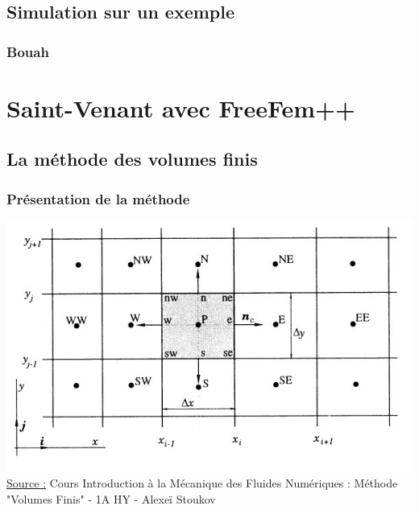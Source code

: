 \documentclass[handout]{beamer}
\begin{document}
\subsection[Simulation]{Simulation sur un exemple}
\begin{frame}
	\frametitle{Bouah}

\end{frame}

\section[FreeFem++]{Saint-Venant avec FreeFem++}
\subsection[Volumes finis]{La méthode des volumes finis}
\begin{frame}
	\frametitle{Présentation de la méthode}
	\centering \includegraphics[scale=0.62]{3.jpg}\\
	\tiny{\underline{Source :} Cours Introduction à la Mécanique des Fluides Numériques : Méthode "Volumes Finis" - 1A HY - Alexeï Stoukov}
\end{frame}
\end{document}
